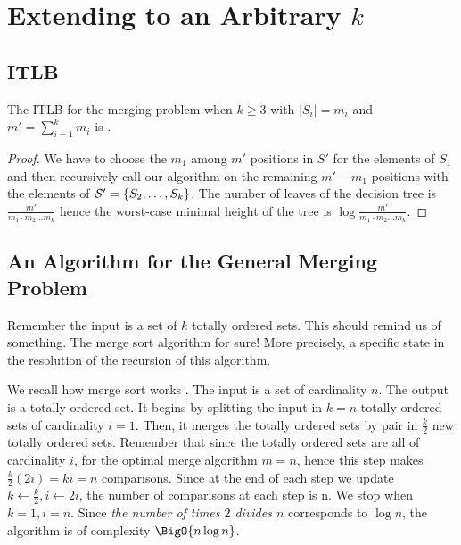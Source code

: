 \section{Extending to an Arbitrary $k$}
\label{tree:merging:kgeq3}


\subsection{ITLB}
\label{tree:merging:kgeq3:ITLB}


\begin{theorem}
The ITLB for the merging problem when $k \geq 3$ with $|S_i| = m_i$ and $m' =
\sum_{i=1}^{k} m_i$ is .
\end{theorem}

\begin{proof}
We have to choose the $m_1$ among $m'$ positions in $S'$ for the elements of
$S_1$ and then recursively call our algorithm on the remaining $m' - m_1$
positions with the elements of ${\cal S}' = \{S_2, \dots, S_k\}$. The number of
leaves of the decision tree is $\frac{m'}{m_1 \cdot m_2 \dots m_k}$ hence the
worst-case minimal height of the tree is $\log \frac{m'}{m_1 \cdot m_2 \dots
m_k}$.
\end{proof}


\subsection{An Algorithm for the General Merging Problem}
\label{tree:merging:kgeq3:alg}

Remember the input is a set of $k$ totally ordered sets. This should remind us
of something. The merge sort algorithm for sure! More precisely, a specific
state in the resolution of the recursion of this algorithm.

We recall how merge sort works \cite{leiserson2001introduction}. The input is a
set of cardinality $n$. The output is a totally ordered set. It begins by
splitting the input in $k = n$ totally ordered sets of cardinality $i = 1$.
Then, it merges the totally ordered sets by pair in $\frac{k}{2}$ new totally
ordered sets. Remember that since the totally ordered sets are all of
cardinality $i$, for the optimal merge algorithm $m=n$, hence this step makes
$\frac{k}{2} (2 i) = k i = n$ comparisons. Since at the end of each step we
update $k \gets \frac{k}{2}, i \gets 2i$, the number of comparisons at each
step is n. We stop when $k = 1, i = n$.
Since \emph{the number of times $2$ divides $n$} corresponds to $\log n$, the
algorithm is of complexity $\BigO{n \log n}$.

